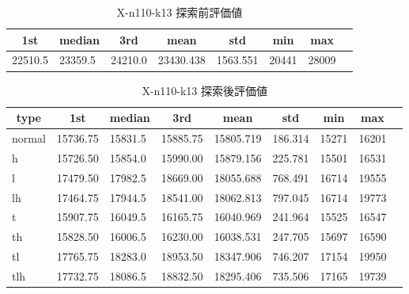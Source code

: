 \begin{table}[htbp]
    \caption{X-n110-k13 探索前評価値}
    \begin{tabular}{|l|l|l|l|l|l|l|l|}\hline
    \multicolumn{1}{|c|}{\textbf{1st}}
    &\multicolumn{1}{c|}{\textbf{median}}
    &\multicolumn{1}{c|}{\textbf{3rd}}
    &\multicolumn{1}{c|}{\textbf{mean}}
    &\multicolumn{1}{c|}{\textbf{std}}
    &\multicolumn{1}{c|}{\textbf{min}}
    &\multicolumn{1}{c|}{\textbf{max}}\\\hline
	22510.5 & 23359.5 & 24210.0 & 23430.438 & 1563.551 & 20441 & 28009\\\hline
	\end{tabular}
\end{table}
\begin{table}[htbp]
    \caption{X-n110-k13 探索後評価値}
    \begin{tabular}{|l|l|l|l|l|l|l|l|l|}\hline
    \multicolumn{1}{|c|}{\textbf{type}}
    &\multicolumn{1}{|c|}{\textbf{1st}}
    &\multicolumn{1}{c|}{\textbf{median}}
    &\multicolumn{1}{c|}{\textbf{3rd}}
    &\multicolumn{1}{c|}{\textbf{mean}}
    &\multicolumn{1}{c|}{\textbf{std}}
    &\multicolumn{1}{c|}{\textbf{min}}
    &\multicolumn{1}{c|}{\textbf{max}}\\\hline
	normal & 15736.75 & 15831.5 & 15885.75 & 15805.719 & 186.314 & 15271 & 16201\\\hline
	h & 15726.50 & 15854.0 & 15990.00 & 15879.156 & 225.781 & 15501 & 16531\\\hline
	l & 17479.50 & 17982.5 & 18669.00 & 18055.688 & 768.491 & 16714 & 19555\\\hline
	lh & 17464.75 & 17944.5 & 18541.00 & 18062.813 & 797.045 & 16714 & 19773\\\hline
	t & 15907.75 & 16049.5 & 16165.75 & 16040.969 & 241.964 & 15525 & 16547\\\hline
	th & 15828.50 & 16006.5 & 16230.00 & 16038.531 & 247.705 & 15697 & 16590\\\hline
	tl & 17765.75 & 18283.0 & 18953.50 & 18347.906 & 746.207 & 17154 & 19950\\\hline
	tlh & 17732.75 & 18086.5 & 18832.50 & 18295.406 & 735.506 & 17165 & 19739\\\hline
	\end{tabular}
\end{table}
